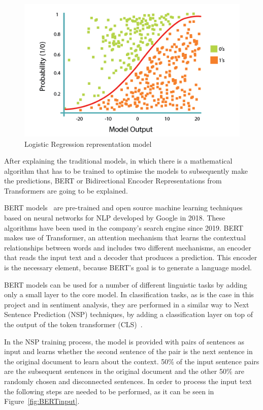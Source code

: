 \begin{figure}[!htp]
    \centering
    \includegraphics[scale=0.6]{img/detection/LogisticRegression.png}
    \caption{Logistic Regression representation model}
    \label{fig:LogisticRegression}
\end{figure}




After explaining the traditional models, in which there is a mathematical algorithm that has to be trained to optimise the models to subsequently make the predictions, BERT or Bidirectional Encoder Representations from Transformers are going to be explained. 

BERT models~\cite{acheampong2021transformer} are pre-trained and open source machine learning techniques based on neural networks for NLP developed by Google in 2018. These algorithms have been used in the company's search engine since 2019. BERT makes use of Transformer, an attention mechanism that learns the contextual relationships between words and includes two different mechanisms, an encoder that reads the input text and a decoder that produces a prediction. This encoder is the necessary element, because BERT's goal is to generate a language model.

BERT models can be used for a number of different linguistic tasks by adding only a small layer to the core model. In classification tasks, as is the case in this project and in sentiment analysis, they are performed in a similar way to Next Sentence Prediction (NSP) techniques, by adding a classification layer on top of the output of the token transformer (CLS)~\cite{BERTExpl89:online}.

In the NSP training process, the model is provided with pairs of sentences as input and learns whether the second sentence of the pair is the next sentence in the original document to learn about the context. 50\% of the input sentence pairs are the subsequent sentences in the original document and the other 50\% are randomly chosen and disconnected sentences. In order to process the input text the following steps are needed to be performed, as it can be seen in Figure~\ref{fig:BERTinput}.

